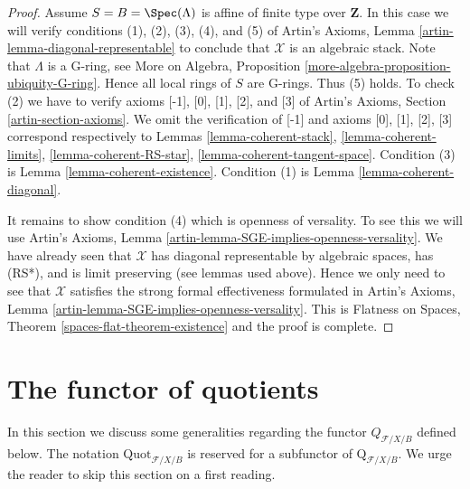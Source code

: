 \begin{proof}
\medskip\noindent
Assume $S = B = \Spec(\Lambda)$ is affine of finite type over $\mathbf{Z}$.
In this case we will verify conditions (1), (2), (3), (4), and (5) of
Artin's Axioms, Lemma \ref{artin-lemma-diagonal-representable}
to conclude that $\mathcal{X}$ is an algebraic stack.
Note that $\Lambda$ is a G-ring, see
More on Algebra, Proposition \ref{more-algebra-proposition-ubiquity-G-ring}.
Hence all local rings of $S$ are G-rings. Thus (5) holds.
To check (2) we have to verify axioms [-1], [0], [1], [2], and [3]
of Artin's Axioms, Section \ref{artin-section-axioms}.
We omit the verification of [-1] and axioms
[0], [1], [2], [3] correspond respectively to
Lemmas \ref{lemma-coherent-stack},
\ref{lemma-coherent-limits},
\ref{lemma-coherent-RS-star},
\ref{lemma-coherent-tangent-space}.
Condition (3) is Lemma \ref{lemma-coherent-existence}.
Condition (1) is Lemma \ref{lemma-coherent-diagonal}.

\medskip\noindent
It remains to show condition (4) which is openness of versality.
To see this we will use
Artin's Axioms, Lemma \ref{artin-lemma-SGE-implies-openness-versality}.
We have already seen that $\mathcal{X}$ has diagonal
representable by algebraic spaces, has (RS*), and is limit preserving
(see lemmas used above).
Hence we only need to see that $\mathcal{X}$ satisfies the strong
formal effectiveness formulated in
Artin's Axioms, Lemma \ref{artin-lemma-SGE-implies-openness-versality}.
This is Flatness on Spaces, Theorem \ref{spaces-flat-theorem-existence}
and the proof is complete.
\end{proof}









\section{The functor of quotients}
\label{section-functor-quotients}

\noindent
In this section we discuss some generalities regarding the functor
$Q_{\mathcal{F}/X/B}$ defined below.
The notation $\text{Quot}_{\mathcal{F}/X/B}$ is reserved for a
subfunctor of $\text{Q}_{\mathcal{F}/X/B}$.
We urge the reader to skip this section on a first reading.

